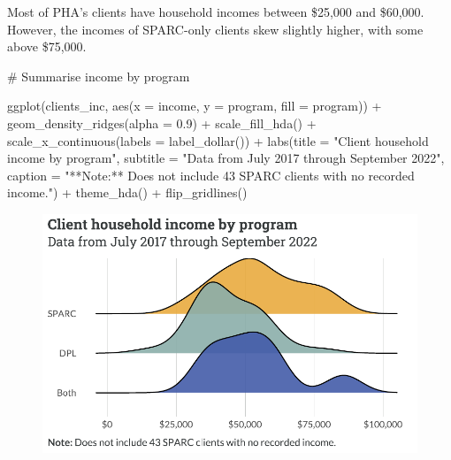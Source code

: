 \documentclass[
  letterpaper,
  DIV=11,
  numbers=noendperiod]{scrartcl}
\newenvironment{Shaded}{\begin{snugshade}}{\end{snugshade}}
\newcommand{\AttributeTok}[1]{\textcolor[rgb]{0.40,0.45,0.13}{#1}}
\newcommand{\CommentTok}[1]{\textcolor[rgb]{0.37,0.37,0.37}{#1}}
\newcommand{\FloatTok}[1]{\textcolor[rgb]{0.68,0.00,0.00}{#1}}
\newcommand{\FunctionTok}[1]{\textcolor[rgb]{0.28,0.35,0.67}{#1}}
\newcommand{\NormalTok}[1]{\textcolor[rgb]{0.00,0.23,0.31}{#1}}
\newcommand{\SpecialCharTok}[1]{\textcolor[rgb]{0.37,0.37,0.37}{#1}}
\newcommand{\StringTok}[1]{\textcolor[rgb]{0.13,0.47,0.30}{#1}}
\begin{document}
Most of PHA's clients have household incomes between \$25,000 and
\$60,000. However, the incomes of SPARC-only clients skew slightly
higher, with some above \$75,000.

\begin{Shaded}
\begin{Highlighting}[]
\CommentTok{\# Summarise income by program}

\FunctionTok{ggplot}\NormalTok{(clients\_inc, }\FunctionTok{aes}\NormalTok{(}\AttributeTok{x =}\NormalTok{ income, }\AttributeTok{y =}\NormalTok{ program, }\AttributeTok{fill =}\NormalTok{ program)) }\SpecialCharTok{+}
  \FunctionTok{geom\_density\_ridges}\NormalTok{(}\AttributeTok{alpha =} \FloatTok{0.9}\NormalTok{) }\SpecialCharTok{+}
  \FunctionTok{scale\_fill\_hda}\NormalTok{() }\SpecialCharTok{+}
  \FunctionTok{scale\_x\_continuous}\NormalTok{(}\AttributeTok{labels =} \FunctionTok{label\_dollar}\NormalTok{()) }\SpecialCharTok{+}
  \FunctionTok{labs}\NormalTok{(}\AttributeTok{title =} \StringTok{"Client household income by program"}\NormalTok{,}
       \AttributeTok{subtitle =} \StringTok{"Data from July 2017 through September 2022"}\NormalTok{,}
       \AttributeTok{caption =} \StringTok{"**Note:** Does not include 43 SPARC clients with no recorded income."}\NormalTok{) }\SpecialCharTok{+}
  \FunctionTok{theme\_hda}\NormalTok{() }\SpecialCharTok{+}
  \FunctionTok{flip\_gridlines}\NormalTok{()}
\end{Highlighting}
\end{Shaded}

\begin{figure}[H]

{\centering \includegraphics{piedmont_files/figure-pdf/income-plot-1.pdf}

}

\end{figure}
\end{document}
